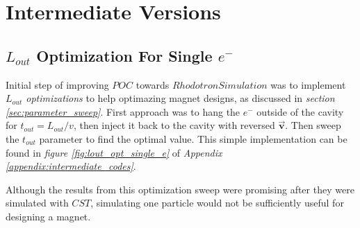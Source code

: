 \documentclass{book}
\begin{document}
\newcommand{\vecthreeBF}[1]{\vec{\textbf{#1}}}
\newcommand{\vecthree}[1]{\vec{#1}}

\newcommand{\parDeriv}[2]{\frac{\partial #1}{\partial #2}}
\newcommand{\parDerivS}[2]{\frac{\partial^2 #1}{\partial #2^2}}
\newcommand{\derivS}[2]{\frac{d^2 #1}{d#2^2}}

\newcommand{\dotProdBF}[2]{\vecthreeBF{#1} \cdot \vecthreeBF{#2}}
\newcommand{\dotProd}[2]{\vecthree{#1} \cdot \vecthree{#2}}

\newcommand{\crossProdBF}[2]{\vecthreeBF{#1} \times \vecthreeBF{#2}}
\newcommand{\crossProd}[2]{\vecthree{#1} \times \vecthree{#2}}


\newcommand{\fromeq}[1]{\textit{equation \ref{eq:#1}}}
\newcommand{\fromeqs}[2]{\textit{equations \ref{eq:#1} and \ref{eq:#2}}}
\newcommand{\fromeqsth}[3]{\textit{equations \ref{eq:#1}, \ref{eq:#2} and \ref{eq:#3}}}

\newcommand{\fromfig}[1]{\textit{figure \ref{fig:#1}}}
\newcommand{\fromfigs}[2]{\textit{figures \ref{fig:#1} and \ref{fig:#2}}}

\newcommand{\fromsec}[1]{\textit{section \ref{sec:#1}}}
\newcommand{\fromsecs}[2]{\textit{sections \ref{sec:#1} and \ref{sec:#2}}}

\newcommand{\fromapp}[1]{\textit{Appendix \ref{appendix:#1}}}



\section{Intermediate Versions}

\subsection{$L_{out}$ Optimization For Single $e^-$}
Initial step of improving $POC$ towards $Rhodotron Simulation$ was to implement \textit{$L_{out}$ optimizations} to help optimazing magnet designs, as discussed in \fromsec{parameter_sweep}.
First approach was to hang the $e^-$ outside of the cavity for $t_{out} = L_{out}/v$, then inject it back to the cavity with reversed $\vecthreeBF{v}$. Then sweep the $t_{out}$ parameter to find the optimal value.
This simple implementation can be found in \fromfig{lout_opt_single_e} of \fromapp{intermediate_codes}.

Although the results from this optimization sweep were promising after they were simulated with $CST$, simulating one particle would not be sufficiently useful for designing a magnet.
\end{document}
